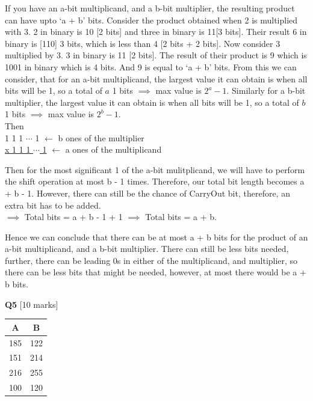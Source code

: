 \documentclass[addpoints]{exam}
\begin{document}
\begin{sloppypar}
\begin{questions}
\begin{solution}
        If you have an a-bit multiplicand, and a b-bit multiplier, the resulting product can have upto `a + b' bits. Consider the product obtained when 2 is multiplied with 3. 2 in binary is 10 [2 bits] and three in binary is 11[3 bits]. Their result 6 in binary is [110] 3 bits, which is less than 4 [2 bits + 2 bits]. Now consider 3 multiplied by 3. 3 in binary is 11 [2 bits]. The result of their product is 9 which is 1001 in binary which is 4 bits. And 9 is equal to `a + b' bits. From this we can consider, that for an a-bit multiplicand, the largest value it can obtain is when all bits will be 1, so a total of $a$ 1 bits $\implies$ max value is $ 2^a - 1 $. Similarly for a b-bit multiplier, the largest value it can obtain is when all bits will be 1, so a total of $b$ 1 bits $\implies$ max value is $2^b - 1$. \\ Then \\ 
        \hspace*{10mm} 1 1 1 $\cdots$ 1 $ \longleftarrow $ b ones of the multiplier \\ 
        \underline{\hspace*{7mm} x 1 1 1 $\cdots$ 1} $ \longleftarrow $ a ones of the multiplicand 

        Then for the most significant 1 of the a-bit mulitplicand, we will have to perform the shift operation at most b - 1 times. Therefore, our total bit length becomes a + b - 1. However, there can still be the chance of CarryOut bit, therefore, an extra bit has to be added. \\ $ \implies $ Total bits = a + b - 1 + 1 $\implies $ Total bits = a + b. 

        Hence we can conclude that there can be at most a + b bits for the product of an a-bit multiplicand, and a b-bit multiplier. There can still be less bits needed, further, there can be leading 0s in either of the multiplicand, and multiplier, so there can be less bits that might be needed, however, at most there would be a + b bits.
    \end{solution}
    \newpage
    \question[10]\textbf{Q5} [10 marks] \\ 
    \begin{tabular}{|c|c|}
        \hline
        \hspace*{10mm}A\hspace*{10mm}  & \hspace*{10mm}B\hspace*{10mm} \\ \hline
        185 & 122 \\ \hline 
        151 & 214 \\ \hline 
        216 & 255 \\ \hline 
        100 & 120 \\ \hline
    \end{tabular}
    \begin{parts}

\end{parts}
\end{questions}
\end{sloppypar}
\end{document}
